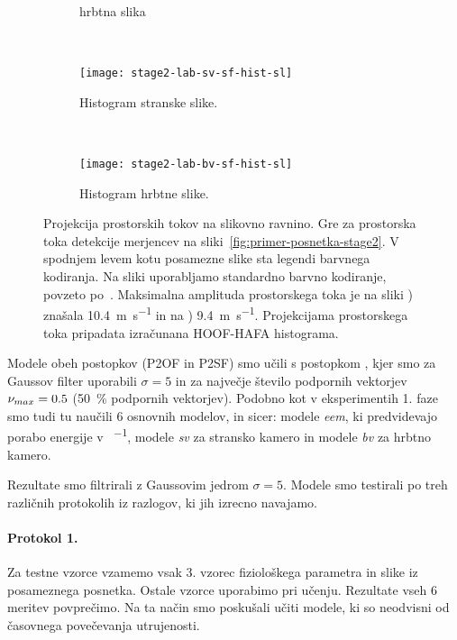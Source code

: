 \begin{figure}[!htb]
\begin{subfigure}[t]{0.45\columnwidth}
		\caption{hrbtna slika}
		\label{fig:stage2-lab-sf-bv-flo}
	\end{subfigure}
	~
	\begin{subfigure}[t]{0.45\columnwidth}
		\texttt{[image: stage2-lab-sv-sf-hist-sl]}
		\caption{Histogram stranske slike.}
	\end{subfigure}
	~
	\begin{subfigure}[t]{0.45\columnwidth}
		\texttt{[image: stage2-lab-bv-sf-hist-sl]}
		\caption{Histogram hrbtne slike.}
	\end{subfigure}
	\caption[Projekcije prostorskih tokov na slikovno ravnino]{Projekcija prostorskih tokov na slikovno ravnino. Gre za prostorska toka detekcije merjencev na sliki~\ref{fig:primer-posnetka-stage2}. V spodnjem levem kotu posamezne slike sta legendi barvnega kodiranja. Na sliki uporabljamo standardno barvno kodiranje, povzeto po~\cite{baker2011database}. Maksimalna amplituda prostorskega toka je na sliki  ) znašala \SI{10.4}{\m\per\s} in na ) \SI{9.4}{\m\per\s}. Projekcijama prostorskega toka pripadata izračunana HOOF-HAFA histograma.}
	\label{fig:prostorski-tok-stage2}
\end{figure}



Modele obeh postopkov (P2OF in P2SF) smo učili s postopkom \nurbf, kjer smo za Gaussov filter uporabili $\sigma=5$ in za največje število podpornih vektorjev $\nu_{max} =\num{0.5}$ (\SI{50}{\%} podpornih vektorjev). Podobno kot v eksperimentih 1. faze smo tudi tu naučili \num{6} osnovnih modelov, in sicer: modele \textit{eem}, ki predvidevajo porabo energije v \si{\kcal\per\min}, modele \textit{sv} za stransko kamero in modele \textit{bv} za hrbtno kamero. %


Rezultate smo filtrirali z Gaussovim jedrom $\sigma=5$. Modele smo testirali po treh različnih protokolih iz razlogov, ki jih izrecno navajamo. %


\paragraph{Protokol 1.}
Za testne vzorce vzamemo vsak 3. vzorec fiziološkega parametra in slike iz posameznega posnetka. Ostale vzorce uporabimo pri učenju. Rezultate vseh 6 meritev povprečimo. Na ta način smo poskušali učiti modele, ki so neodvisni od časovnega povečevanja utrujenosti.

